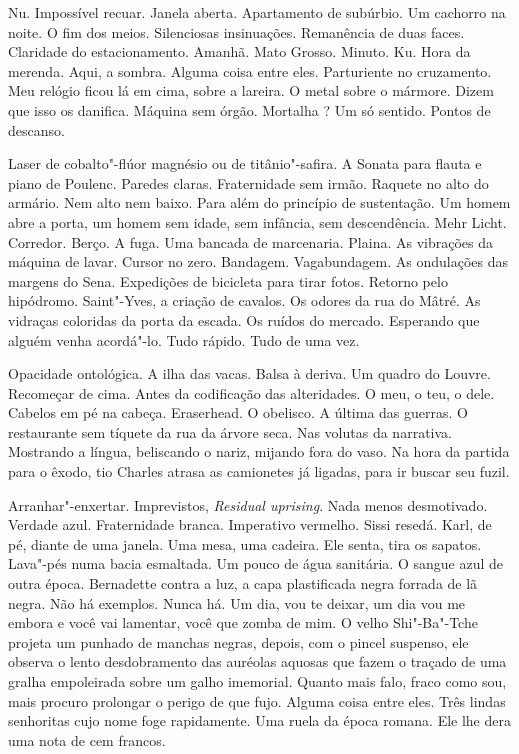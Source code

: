 Nu. Impossível recuar. Janela aberta. Apartamento de subúrbio. Um
cachorro na noite. O fim dos meios. Silenciosas insinuações. Remanência
de duas faces. Claridade do estacionamento. Amanhã. Mato Grosso. Minuto.
Ku. Hora da merenda. Aqui, a sombra. Alguma coisa entre eles.
Parturiente no cruzamento. Meu relógio ficou lá em cima, sobre a
lareira. O metal sobre o mármore. Dizem que isso os danifica. Máquina
sem órgão. Mortalha ? Um só sentido. Pontos de descanso.

Laser de cobalto"-flúor magnésio ou de titânio"-safira. A Sonata para
flauta e piano de Poulenc. Paredes claras. Fraternidade sem irmão.
Raquete no alto do armário. Nem alto nem baixo. Para além do princípio
de sustentação. Um homem abre a porta, um homem sem idade, sem infância,
sem descendência. Mehr Licht. Corredor. Berço. A fuga. Uma bancada de
marcenaria. Plaina. As vibrações da máquina de lavar. Cursor no zero.
Bandagem. Vagabundagem. As ondulações das margens do Sena. Expedições de
bicicleta para tirar fotos. Retorno pelo hipódromo. Saint"-Yves, a
criação de cavalos. Os odores da rua do Mâtré. As vidraças coloridas da
porta da escada. Os ruídos do mercado. Esperando que alguém venha
acordá"-lo. Tudo rápido. Tudo de uma vez.

Opacidade ontológica. A ilha das vacas. Balsa à deriva. Um quadro do
Louvre. Recomeçar de cima. Antes da codificação das alteridades. O meu,
o teu, o dele. Cabelos em pé na cabeça. Eraserhead. O obelisco. A última
das guerras. O restaurante sem tíquete da rua da árvore seca. Nas
volutas da narrativa. Mostrando a língua, beliscando o nariz, mijando
fora do vaso. Na hora da partida para o êxodo, tio Charles atrasa as
camionetes já ligadas, para ir buscar seu fuzil.

Arranhar"-enxertar. Imprevistos, \emph{Residual uprising}. Nada menos
desmotivado. Verdade azul. Fraternidade branca. Imperativo vermelho.
Sissi resedá. Karl, de pé, diante de uma janela. Uma mesa, uma cadeira.
Ele senta, tira os sapatos. Lava"-pés numa bacia esmaltada. Um pouco de
água sanitária. O sangue azul de outra época. Bernadette contra a luz, a
capa plastificada negra forrada de lã negra. Não há exemplos. Nunca há.
Um dia, vou te deixar, um dia vou me embora e você vai lamentar, você
que zomba de mim. O velho Shi"-Ba"-Tche projeta um punhado de manchas
negras, depois, com o pincel suspenso, ele observa o lento desdobramento
das auréolas aquosas que fazem o traçado de uma gralha empoleirada sobre
um galho imemorial. Quanto mais falo, fraco como sou, mais procuro
prolongar o perigo de que fujo. Alguma coisa entre eles. Três lindas
senhoritas cujo nome foge rapidamente. Uma ruela da época romana. Ele
lhe dera uma nota de cem francos.

